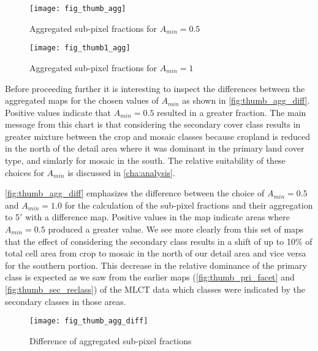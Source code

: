 \begin{figure}[hpt] 
\begin{center}
  

\texttt{[image: fig\_thumb\_agg]}
\end{center} 
\caption{Aggregated sub-pixel fractions for $A_{min}=0.5$}
\label{fig:thumb_agg}
\end{figure} 

\begin{figure}[hpt] 
\begin{center}
  

\texttt{[image: fig\_thumb1\_agg]}
\end{center} 
\caption{Aggregated sub-pixel fractions for $A_{min}=1$}
\label{fig:thumb1_agg}
\end{figure} 


Before proceeding further it is interesting to inspect the differences
between the aggregated maps for the chosen values of $A_{min}$ as
shown in \autoref{fig:thumb_agg_diff}.  Positive values indicate that
$A_{min} = 0.5$ resulted in a greater fraction.  The main message from
this chart is that considering the secondary cover class results in
greater mixture between the crop and mosaic classes because cropland
is reduced in the north of the detail area where it was dominant in
the primary land cover type, and simlarly for mosaic in the south.
The relative suitability of these choices for $A_{min}$ is discussed
in \autoref{cha:analysis}.



\autoref{fig:thumb_agg_diff} emphasizes the difference between the
choice of $A_{min}=0.5$ and $A_{min}=1.0$ for the calculation of the
sub-pixel fractions and their aggregation to 5$'$ with a difference
map.  Positive values in the map indicate areas where $A_{min}=0.5$
produced a greater value.  We see more clearly from this set of maps
that the effect of considering the secondary class results in a shift
of up to 10\% of total cell area from crop to mosaic in the north of
our detail area and vice versa for the southern portion.  This
decrease in the relative dominance of the primary class is expected as
we saw from the earlier maps (\autoref{fig:thumb_pri_facet} and
\autoref{fig:thumb_sec_reclass}) of the MLCT data which classes were
indicated by the secondary classes in those areas.

\begin{figure}[hpt]
\begin{center}
  

\texttt{[image: fig\_thumb\_agg\_diff]}
\end{center} 
\caption{ Difference of aggregated sub-pixel fractions}
\label{fig:thumb_agg_diff}
\end{figure} 

